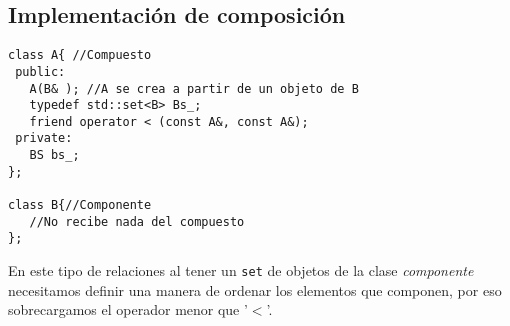 \subsection{ Implementación de composición}
\begin{center}
	\begin{lstlisting}[frame=single]
class A{ //Compuesto
 public:
   A(B& ); //A se crea a partir de un objeto de B
   typedef std::set<B> Bs_;
   friend operator < (const A&, const A&);
 private:
   BS bs_;
};

class B{//Componente
   //No recibe nada del compuesto
};
\end{lstlisting}
\end{center}
En este tipo de relaciones al tener un \texttt{set} de objetos de la clase \textit{componente} necesitamos definir una manera de ordenar los elementos que componen, por eso sobrecargamos el operador menor que '$<$'.